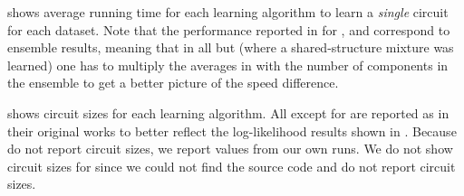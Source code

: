 \begin{table}[t]
  \caption{Learning time benchmark for a single circuit of , ,
    ,  and .}
  \label{tab:bintime}
\end{table}

 shows average running time for each learning algorithm to learn a \emph{single}
circuit for each dataset. Note that the performance reported in  for
,  and  correspond to ensemble results, meaning
that in all but  (where a shared-structure mixture was learned) one has to
multiply the averages in  with the number of components in the ensemble to get a
better picture of the speed difference.

 shows circuit sizes for each learning algorithm. All except for
 are reported as in their original works to better reflect the log-likelihood
results shown in . Because \citet{gens13} do not report circuit sizes, we report
values from our own runs. We do not show circuit sizes for  since we could not
find the source code and \citet{jaini18a} do not report circuit sizes.

